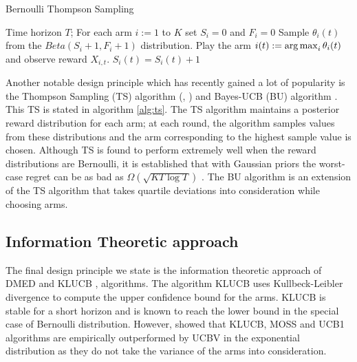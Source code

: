\begin{algorithm}[!th]
\caption{Bernoulli Thompson Sampling}
\label{alg:ts}
\begin{algorithmic}
 Time horizon $T$; 
 For each arm $i:=1$ to $K$ set $S_i =0$ and $F_i =0$
\State {}
\State {}
\State Sample $\theta_{i}(t)$ from the $Beta(S_i+1,F_i+1)$ distribution.
\EndFor
\State Play the arm $i(t):=\operatorname*{arg\,max}_i\theta_i(t)$ and observe reward $X_{i,t}$.
$S_i (t) = S_i (t) + 1$
\EndIf
\EndFor
\end{algorithmic}
\end{algorithm}

    
    Another notable design principle which has recently gained a lot of popularity is the Thompson Sampling (TS) algorithm (\citep{thompson1933likelihood}, \citep{agrawal2011analysis})  and  Bayes-UCB (BU) algorithm \citep{kaufmann2012bayesian}. This TS is stated in algorithm \ref{alg:ts}. The TS algorithm maintains a posterior reward distribution for each arm; at each round, the algorithm samples values from these distributions and the arm corresponding to the highest sample value is chosen. Although TS is found to perform extremely well when the reward distributions are Bernoulli, it is established that with Gaussian priors the worst-case regret can be as bad as $\Omega \left( \sqrt{KT\log T}\right)$ \citep{lattimore2015optimally}. The BU algorithm is an extension of the TS algorithm that takes quartile deviations into consideration while choosing arms.

\subsection{Information Theoretic approach}
    
    The final design principle we state is the information theoretic approach of DMED  \citep{honda2010asymptotically} and KLUCB \citep{garivier2011kl},\citep{cappe2013kullback} algorithms. The algorithm KLUCB uses Kullbeck-Leibler divergence to compute the upper confidence bound for the arms. KLUCB is stable for a short horizon and is known to reach the \citet{lai1985asymptotically} lower bound in the special case of Bernoulli distribution. However, \citet{garivier2011kl} showed that KLUCB, MOSS and UCB1 algorithms are empirically outperformed by UCBV in the exponential distribution as they do not take the variance of the arms into consideration.
    
